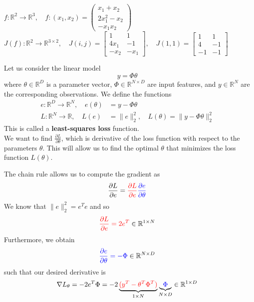 \documentclass{article}
\begin{document}
\begin{example}
    $f:\mathbb{R}^2\to \mathbb{R}^3,\quad f:(x_1,x_2)=\begin{pmatrix}
        x_1+x_2 \\ 
        2x_1^2-x_2 \\ 
        -x_1x_2
    \end{pmatrix}$\\ 
    $J(f):\mathbb{R}^2\to \mathbb{R}^{3\times 2},\quad J(i,j)=\begin{bmatrix}
        1 & 1 \\ 
        4x_1 & -1 \\ 
        -x_2 & -x_1 
    \end{bmatrix},\quad
    J(1,1)=\begin{bmatrix}
        1 & 1 \\ 
        4 & -1 \\ 
        -1 & -1
    \end{bmatrix}$
\end{example}
\begin{example}
   Let us consider the linear model 
   $$y=\Phi\theta$$
   where $\theta\in \mathbb{R}^D$ is a parameter vector, $\Phi\in
   \mathbb{R}^{N\times D}$ are input features, and $y\in \mathbb{R}^N$ are the
   corresponding observations. We define the functions 
   $$\begin{aligned}
       e:\mathbb{R}^D\to \mathbb{R}^N,\quad e(\theta)&=y-\Phi\theta \\
       L:\mathbb{R}^N\to \mathbb{R},\quad L(e)&=\lVert e\rVert_2^2, \quad
       L(\theta)= \lVert y-\Phi\theta\rVert_2^2
   \end{aligned}$$
   This is called a \textbf{least-squares loss} function.\\ We want to find
   $\frac{\partial{L}}{\partial{\theta}}$, which is derivative of the loss
   function with respect to the parameters $\theta$. This will allow us to
   find the optimal $\theta$ that minimizes the loss function $L(\theta)$.

   The chain rule allows us to compute the gradient as 
   $$\frac{\partial{L}}{\partial{e}}={\color{red}\frac{\partial{L}}{\partial{e}}}{\color{blue}\frac{\partial{e}}{\partial{\theta}}}$$
   We know that $\lVert e\rVert_2^2=e^Te$ and so 
   $${\color{red}\frac{\partial{L}}{\partial{e}}=2e^T}\in \mathbb{R}^{1\times
   N}$$
   Furthermore, we obtain 
   $${\color{blue}\frac{\partial{e}}{\partial{\theta}}=-\Phi}\in
   \mathbb{R}^{N\times D}$$
   such that our desired derivative is
   $$
   \nabla{L}_{\theta}=-2e^T\Phi=-2\underbrace{\color{red}(y^T-\theta^T\Phi^T)}_{1\times
   N}\underbrace{\color{blue}\Phi}_{N\times D}\in \mathbb{R}^{1\times D}\\ 
   $$
\end{example}
\end{document}
